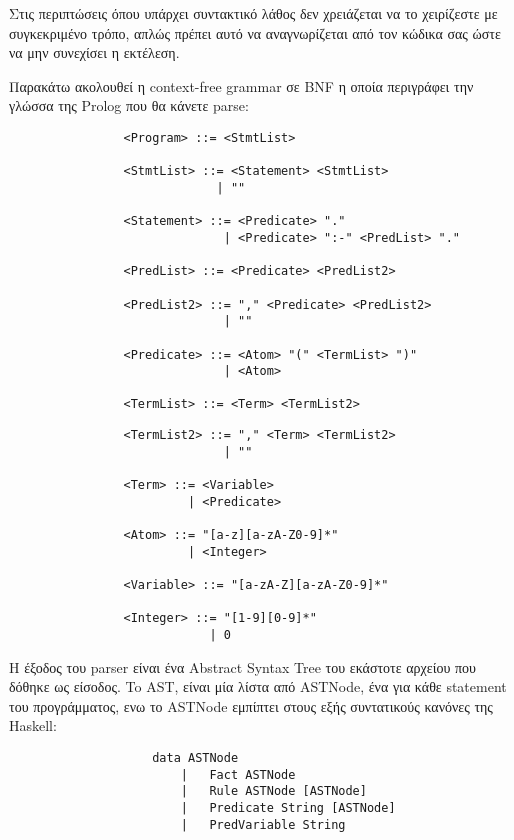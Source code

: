 \documentclass[10pt]{article}
\begin{document}
Στις περιπτώσεις όπου υπάρχει συντακτικό λάθος δεν χρειάζεται να το χειρίζεστε με συγκεκριμένο τρόπο, απλώς πρέπει αυτό να αναγνωρίζεται από τον κώδικα σας ώστε να μην συνεχίσει η εκτέλεση.\ 

Παρακάτω ακολουθεί η context-free grammar σε BNF η οποία περιγράφει την γλώσσα της Prolog που θα κάνετε parse:


\begin{verbatim}
                <Program> ::= <StmtList>

                <StmtList> ::= <Statement> <StmtList>
                             | ""
                                  
                <Statement> ::= <Predicate> "."
                              | <Predicate> ":-" <PredList> "."
                           
                <PredList> ::= <Predicate> <PredList2>

                <PredList2> ::= "," <Predicate> <PredList2>
                              | ""
                     
                <Predicate> ::= <Atom> "(" <TermList> ")"
                              | <Atom>
                        
                <TermList> ::= <Term> <TermList2>
\end{verbatim}
\begin{verbatim}
                <TermList2> ::= "," <Term> <TermList2>
                              | ""
                        
                <Term> ::= <Variable>
                         | <Predicate>
                    
                <Atom> ::= "[a-z][a-zA-Z0-9]*"
                         | <Integer>

                <Variable> ::= "[a-zA-Z][a-zA-Z0-9]*"

                <Integer> ::= "[1-9][0-9]*"
                            | 0
\end{verbatim}





H έξοδος του parser είναι ένα Abstract Syntax Tree του εκάστοτε αρχείου που δόθηκε ως είσοδος. To AST, είναι μία λίστα από ASTNode, ένα για κάθε statement του προγράμματος, ενω το ASTNode εμπίπτει στους εξής συντατικούς κανόνες της Haskell:

\begin{verbatim}
                    data ASTNode
                        |   Fact ASTNode
                        |   Rule ASTNode [ASTNode]
                        |   Predicate String [ASTNode]
                        |   PredVariable String
\end{verbatim}
\end{document}
